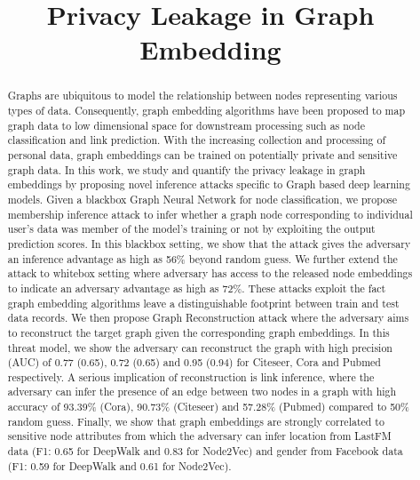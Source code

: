 \documentclass[conference]{IEEEtran}
\begin{document}

\title{Privacy Leakage in Graph Embedding}






\maketitle

\begin{abstract}
Graphs are ubiquitous to model the relationship between nodes representing various types of data.
Consequently, graph embedding algorithms have been proposed to map graph data to low dimensional space for downstream processing such as node classification and link prediction.
With the increasing collection and processing of personal data, graph embeddings can be trained on potentially private and sensitive graph data.
In this work, we study and quantify the privacy leakage in graph embeddings by proposing novel inference attacks specific to Graph based deep learning models.
Given a blackbox Graph Neural Network for node classification, we propose membership inference attack to infer whether a graph node corresponding to individual user's data was member of the model's training or not by exploiting the output prediction scores.
In this blackbox setting, we show that the attack gives the adversary an inference advantage as high as 56\% beyond random guess.
We further extend the attack to whitebox setting where adversary has access to the released node embeddings to indicate an adversary advantage as high as 72\%.
These attacks exploit the fact graph embedding algorithms leave a distinguishable footprint between train and test data records.
We then propose Graph Reconstruction attack where the adversary aims to reconstruct the target graph given the corresponding graph embeddings.
In this threat model, we show the adversary can reconstruct the graph with high precision (AUC) of 0.77 (0.65), 0.72 (0.65) and 0.95 (0.94) for Citeseer, Cora and Pubmed respectively.
A serious implication of reconstruction is link inference, where the adversary can infer the presence of an edge between two nodes in a graph with high accuracy of 93.39\% (Cora), 90.73\% (Citeseer) and 57.28\% (Pubmed) compared to 50\% random guess.
Finally, we show that graph embeddings are strongly correlated to sensitive node attributes from which the adversary can infer location from LastFM data (F1: 0.65 for DeepWalk and 0.83 for Node2Vec) and gender from Facebook data (F1: 0.59 for DeepWalk and 0.61 for Node2Vec).
\end{abstract}
\end{document}
